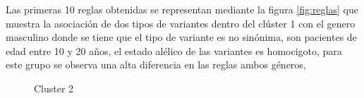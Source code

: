 Las primeras 10 reglas obtenidas se representan mediante la figura \ref{fig:reglas} que muestra la asociación de dos tipos de variantes dentro del clúster 1 con el genero masculino donde se tiene que el tipo de variante es no sinónima, son pacientes de edad entre 10 y 20 años, el estado alélico de las variantes es homocigoto, para este grupo se observa una alta diferencia en las reglas ambos géneros, 


\begin{figure}[H]
	\centering
	\caption{Cluster 2} \label{fig:c2}
\end{figure}

